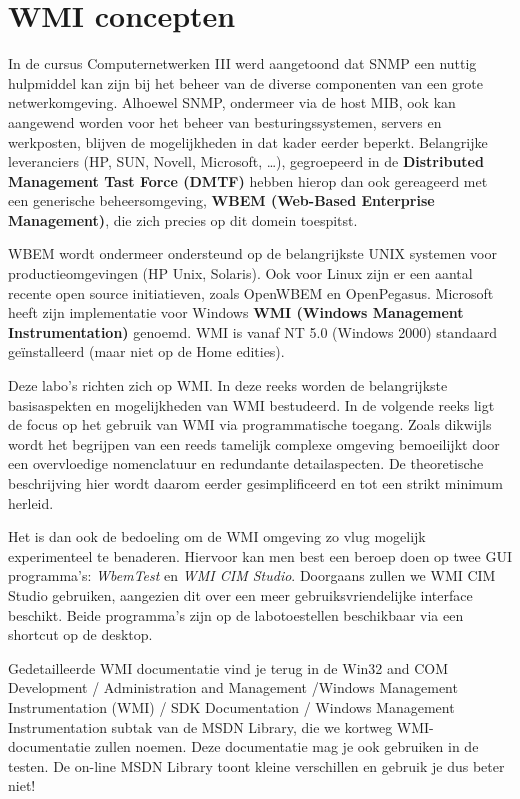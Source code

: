 \documentclass[11pt,a4paper]{report}
\begin{document}
\chapter{WMI concepten}
In de cursus Computernetwerken III werd aangetoond dat SNMP een nuttig hulpmiddel kan zijn bij het beheer van de diverse componenten van een grote netwerkomgeving. Alhoewel SNMP, ondermeer via de host MIB, ook kan aangewend worden voor het beheer van besturingssystemen, servers en werkposten, blijven de mogelijkheden in dat kader eerder beperkt. Belangrijke leveranciers (HP, SUN, Novell, Microsoft, …), gegroepeerd in de \textbf{Distributed Management Tast Force (DMTF)} hebben hierop dan ook gereageerd met een generische beheersomgeving, \textbf{WBEM (Web-Based Enterprise Management)}, die zich precies op dit domein toespitst. 
\par WBEM wordt ondermeer ondersteund op de belangrijkste UNIX systemen voor productieomgevingen (HP Unix, Solaris). Ook voor Linux zijn er een aantal recente open source initiatieven, zoals OpenWBEM en OpenPegasus. Microsoft heeft zijn implementatie voor Windows \textbf{WMI (Windows Management Instrumentation)} genoemd. WMI is vanaf NT 5.0 (Windows 2000) standaard geïnstalleerd (maar niet op de Home edities).
\par Deze labo's richten zich op WMI. In deze reeks worden de belangrijkste basisaspekten en mogelijkheden van WMI bestudeerd. In de volgende reeks ligt de focus op het gebruik van WMI via programmatische toegang. Zoals dikwijls wordt het begrijpen van een reeds tamelijk complexe omgeving bemoeilijkt door een overvloedige nomenclatuur en redundante detailaspecten. De theoretische beschrijving hier wordt daarom eerder gesimplificeerd en tot een strikt minimum herleid. 
\par Het is dan ook de bedoeling om de WMI omgeving zo vlug mogelijk experimenteel te benaderen. Hiervoor kan men best een beroep doen op twee GUI programma's: \textit{WbemTest} en \textit{WMI CIM Studio}. Doorgaans zullen we WMI CIM Studio gebruiken, aangezien dit over een meer gebruiksvriendelijke interface beschikt. Beide programma's zijn op de labotoestellen beschikbaar via een shortcut op de desktop.
\par Gedetailleerde WMI documentatie vind je terug in de Win32 and COM Development / Administration and Management /Windows Management Instrumentation (WMI) / SDK Documentation / Windows Management Instrumentation  subtak van de MSDN Library, die we kortweg WMI-documentatie zullen noemen. Deze documentatie mag je ook gebruiken in de testen.
De on-line MSDN Library toont kleine verschillen en gebruik je dus beter niet!
\end{document}
